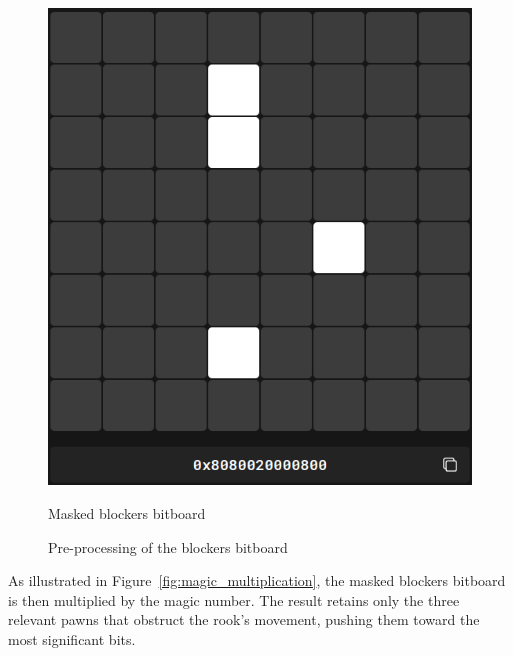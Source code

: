 \begin{figure}[H]
\begin{minipage}[c]{0.4\textwidth}
        \includegraphics[width=\textwidth]{Imagenes/magics_processed_blockers.png}
        \caption{Masked blockers bitboard}
    \end{minipage}
    \caption{Pre-processing of the blockers bitboard}
    \label{fig:magic_preprocessing}
\end{figure}

\noindent As illustrated in Figure~\ref{fig:magic_multiplication}, the masked blockers bitboard is then multiplied by the magic number. The result retains only the three relevant pawns that obstruct the rook's movement, pushing them toward the most significant bits.

